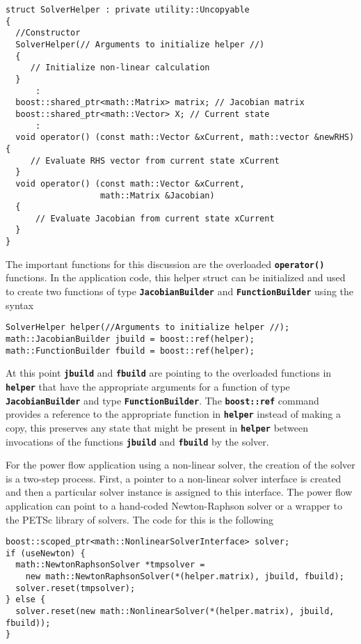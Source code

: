 {
\color{red}
\begin{Verbatim}[fontseries=b]
struct SolverHelper : private utility::Uncopyable
{
  //Constructor
  SolverHelper(// Arguments to initialize helper //)
  {
     // Initialize non-linear calculation
  }
      :
  boost::shared_ptr<math::Matrix> matrix; // Jacobian matrix
  boost::shared_ptr<math::Vector> X; // Current state
      :
  void operator() (const math::Vector &xCurrent, math::vector &newRHS)  {
     // Evaluate RHS vector from current state xCurrent
  }
  void operator() (const math::Vector &xCurrent,
                   math::Matrix &Jacobian)
  {
      // Evaluate Jacobian from current state xCurrent
  }
}
\end{Verbatim}
}

The important functions for this discussion are the overloaded \texttt{\textbf{operator()}} functions. In the application code, this helper struct can be initialized and used to create two functions of type \texttt{\textbf{JacobianBuilder}} and \texttt{\textbf{FunctionBuilder}} using the syntax

{
\color{red}
\begin{Verbatim}[fontseries=b]
SolverHelper helper(//Arguments to initialize helper //);
math::JacobianBuilder jbuild = boost::ref(helper);
math::FunctionBuilder fbuild = boost::ref(helper);
\end{Verbatim}
}

At this point \texttt{\textbf{jbuild}} and \texttt{\textbf{fbuild}} are pointing to the overloaded functions in \texttt{\textbf{helper}} that have the appropriate arguments for a function of type \texttt{\textbf{JacobianBuilder}} and type \texttt{\textbf{FunctionBuilder}}. The \texttt{\textbf{boost::ref}} command provides a reference to the appropriate function in \texttt{\textbf{helper}} instead of making a copy, this preserves any state that might be present in \texttt{\textbf{helper}} between invocations of the functions \texttt{\textbf{jbuild}} and \texttt{\textbf{fbuild}} by the solver.

For the power flow application using a non-linear solver, the creation of the solver is a two-step process. First, a pointer to a non-linear solver interface is created and then a particular solver instance is assigned to this interface. The power flow application can point to a hand-coded Newton-Raphson solver or a wrapper to the PETSc library of solvers. The code for this is the following

{
\color{red}
\begin{Verbatim}[fontseries=b]
boost::scoped_ptr<math::NonlinearSolverInterface> solver;
if (useNewton) {
  math::NewtonRaphsonSolver *tmpsolver =
    new math::NewtonRaphsonSolver(*(helper.matrix), jbuild, fbuild);
  solver.reset(tmpsolver);
} else {
  solver.reset(new math::NonlinearSolver(*(helper.matrix), jbuild, fbuild));
}
\end{Verbatim}
}

